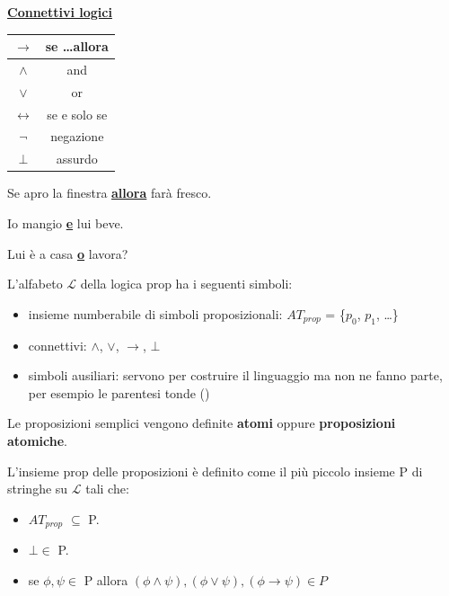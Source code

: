 \documentclass[a4paper, 12pt]{book}
\newcommand{\definizione}[2]{%
\vspace{15pt}%
\begin{tcolorbox}[
  colback=cyan!5!white,
  colframe=blue!50!black,
  title=\textbf{Definizione: #1}, %
  coltitle=white,
  fonttitle=\bfseries,
  arc=3mm,
  boxrule=0.5pt,
  enhanced,
  breakable
]
#2 %
\end{tcolorbox}
\vspace{15pt}%
}
\begin{document}
  \textbf{\uline{Connettivi logici}}

  \noindent
  \begin{minipage}[t]{0.45\textwidth}
  \centering
  \begin{tabular}{|c|c|}
  \hline
  $\rightarrow$ & se \dots allora \\ \hline
  $\land$ & and \\ \hline
  $\lor$ & or \\ \hline
  $\leftrightarrow$ & se e solo se \\ \hline
  $\neg$ & negazione \\ \hline
  $\bot$ & assurdo \\ \hline


  \end{tabular}
  \end{minipage}%
  \hfill
  \begin{minipage}[t]{0.50\textwidth}
  Se apro la finestra \uline{\textbf{allora}} farà fresco.\par
  Io mangio \uline{\textbf{e}} lui beve.\par
  Lui è a casa \uline{\textbf{o}} lavora?\par

  \end{minipage}

  \definizione{Alfabeto $\mathcal{L}$}{L'alfabeto $\mathcal{L}$ della logica prop ha i seguenti simboli:
  \begin{itemize}
    \item insieme numberabile di simboli proposizionali: \textbf{$AT$}$_{prop}$ = \{$p_0$, $p_1$, \dots\}
    \item connettivi: $\land$, $\lor$, $\rightarrow$, $\bot$
    \item simboli ausiliari: servono per costruire il linguaggio ma non ne fanno parte, per esempio le parentesi tonde ()
  \end{itemize}
  }
  Le proposizioni semplici vengono definite \textbf{atomi} oppure \textbf{proposizioni atomiche}.

  \definizione{Appartenenza insieme prop}{L'insieme prop delle proposizioni è definito come il più piccolo insieme P di stringhe su $\mathcal{L}$ tali che:
  \begin{itemize}
    \item $AT_{prop}$ $\subseteq$ P.
    \item $\bot \in$ P.
    \item se $\phi, \psi \in$ P allora $(\phi \land \psi), (\phi \lor \psi), (\phi \rightarrow \psi) \in P$
  \end{itemize}}
\end{document}
